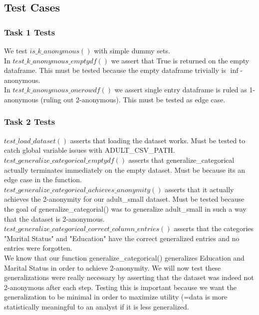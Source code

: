 \documentclass{article}
\begin{document}
		\subsection{Test Cases}
	
		\subsubsection{Task 1 Tests}
			We test $is\_k\_anonymous()$ with simple dummy sets.\\
			In $test\_k\_anonymous\_emptydf()$ we assert that True is returned on the empty dataframe. This must be tested because the empty dataframe trivially is $\inf$-anonymous.\\
			In $test\_k\_anonymous\_onerowdf()$ we assert single entry dataframe is ruled as 1-anonymous (ruling out 2-anonymous). This must be tested as edge case.\\
		\subsubsection{Task 2 Tests}
			$test\_load\_dataset()$ asserts that loading the dataset works. Must be tested to catch global variable issues with ADULT\_CSV\_PATH.\\
			$test\_generalize\_categorical\_emptydf()$ asserts that generalize\_categorical actually terminates immediately on the empty dataset. Must be  because its an edge case in the function.\\
			$test\_generalize\_categorical\_achieves\_anonymity()$ asserts that it actually achieves the 2-anonymity for our adult\_small dataset. Must be tested because the goal of generalize\_categorial() was to generalize adult\_small in such a way that the dataset is 2-anonymous.\\
			$test\_generalize\_categorical\_correct\_column\_entries()$ asserts that the categories "Marital Status" and "Education" have the correct generalized entries and no entries were forgotten.\\
			
			We know that our function generalize\_categorical() generalizes Education and Marital Status in order to achieve 2-anonymity. We will now test these generalizations were really necessary by asserting that the dataset was indeed not 2-anonymous after each step. Testing this is important because we want the generalization to be minimal in order to maximize utility (=data is more statistically meaningful to an analyst if it is less generalized.\\
			
\end{document}
